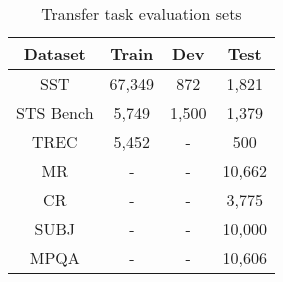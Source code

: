 \documentclass[11pt,a4paper]{article}
\begin{document}
\begin{table}[ht]
\small
\begin{center}

\begin{tabular}{|c|c|c|c|}
\hline
Dataset & Train & Dev & Test \\
\hline
SST       & 67,349 & 872 & 1,821 \\
STS Bench &  5,749 & 1,500 & 1,379 \\
\hline
TREC      & 5,452 &  -   &   500 \\
\hline
MR        & - & - & 10,662 \\
CR        & - & - & 3,775 \\
SUBJ      & - & - & 10,000 \\
MPQA      & - & - & 10,606 \\
\hline
\end{tabular}

\end{center}
\caption{Transfer task evaluation sets}
\label{tab:eval-set-size}
\end{table}
\end{document}
